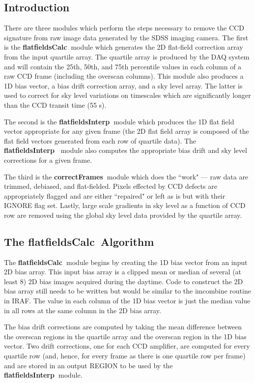 \def\cfrm{{\bf correctFrames\ }}
\def\cff{{\bf flatfieldsCalc\ }}
\def\iff{{\bf flatfieldsInterp\ }}
\subsection{Introduction}

There are three modules which perform the steps necessary to
remove the CCD signature from raw image data generated
by the SDSS imaging camera. The first is the \cff module which generates
the 2D flat-field correction array from the input quartile array.
The quartile array is produced by the DAQ system and will contain the
25th, 50th, and 75th percentile values in each column of a raw CCD frame
(including the overscan columns). 
This module also produces a 1D bias vector, a bias drift correction array,
and a sky level array. The latter is used to correct for sky level variations
on timescales which are significantly longer than the CCD transit time (55 s).

The second is the \iff module which produces the 1D flat field vector 
appropriate for any given frame (the 2D flat field array is composed of
the flat field vectors generated from each row of quartile data). The \iff
module also computes the appropriate bias drift and sky level
corrections for a given frame. 

The third is the \cfrm module which does
the ``work" --- raw data are trimmed, debiased, and
flat-fielded.  Pixels effected by CCD defects are appropriately flagged and are
either ``repaired" or left as is but with their IGNORE
flag set. Lastly, large scale gradients in sky level as a function of
CCD row are removed using the global sky level data provided by the
quartile array.

\subsection{The \cff Algorithm}

The \cff module begins by creating the 1D bias vector from an input
2D bias array. This input bias array is a clipped mean or median of several
(at least 8) 2D bias images acquired during the daytime. Code to 
construct the 2D bias array still needs to be written but would be
similar to the imcombine routine in IRAF. The value in
each column of the 1D bias vector is just the median value in all rows
at the same column in the 2D bias array. 

The bias drift corrections are computed by taking the mean difference
between the overscan regions in the quartile array and the overscan
region in the 1D bias vector. Two drift corrections, one for each
CCD amplifier, are computed for every quartile row (and, hence, for
every frame as there is one quartile row per frame) and are stored
in an output REGION to be used by the \iff module.

